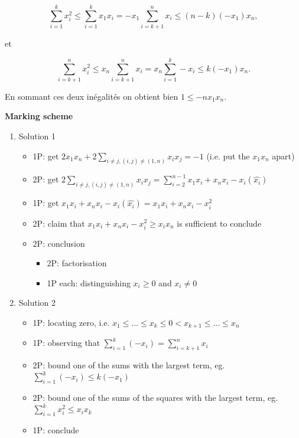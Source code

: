 \[
\sum_{i=1}^k x_i^2\leq \sum_{i=1}^k x_1x_i= -x_1\sum_{i=k+1}^n x_i\leq (n-k)(-x_1)x_n,
\]

et

\[
\sum_{i=k+1}^n x_i^2\leq x_n\sum_{i=k+1}^n x_i=x_n\sum_{i=1}^k -x_i\leq k(-x_1)x_n.
\]

En sommant ces deux inégalités on obtient bien $1\leq -nx_1x_n$.

\newpage
\textbf{Marking scheme}

\begin{enumerate}
    \item Solution 1
    \begin{itemize}
        \item 1P: get $2x_1x_n+2\sum_{i\neq j, (i,j)\neq (1,n)}x_ix_j=-1$ (i.e. put the $x_1x_n$ apart)
        \item 2P: get $2\sum_{i\neq j, (i,j)\neq (1,n)}x_ix_j=\sum_{i=2}^{n-1} x_1x_i+x_nx_i-x_i(\hat{x_i})$
        \item 1P: get $x_1x_i+x_nx_i-x_i(\hat{x_i})=x_1x_i+x_nx_i-x_i^2$
        \item 2P: claim that $x_1x_i+x_nx_i-x_i^2\geq x_ix_n$ is sufficient to conclude
        \item 2P: conclusion \begin{itemize}
            \item 2P: factorisation
            \item 1P each: distinguishing $x_i\geq 0$ and $x_i\neq 0$
        \end{itemize}
    \end{itemize}
    
    \item Solution 2
    \begin{itemize}
        \item 1P: locating zero, i.e. $x_1\leq\ldots\leq x_k\leq 0<x_{k+1}\leq \ldots\leq x_n$
        \item 1P: observing that $\sum_{i=1}^k (-x_i)=\sum_{i=k+1}^nx_i$
        \item 2P: bound one of the sums with the largest term, eg. $\sum_{i=1}^k(-x_i)\leq k(-x_1)$
        \item 2P: bound one of the sums of the squares with the largest term, eg. $\sum_{i=1}^k x_i^2\leq x_ix_k$
        \item 1P: conclude
    \end{itemize}
\end{enumerate}

